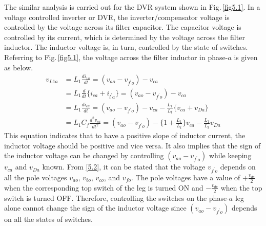 The similar analysis is carried out for the DVR system shown in Fig.\,\ref{fig5.1}. In a voltage controlled inverter or DVR, the inverter/compensator voltage is controlled by the voltage across its filter capacitor. The capacitor voltage is controlled by its current, which is determined by the voltage across the filter inductor. The inductor voltage is, in turn, controlled by the state of switches. Referring to Fig.\,\ref{fig5.1}, the voltage across the filter inductor in phase-$a$ is given as below.
\begin{equation}
\begin{aligned}
v_{L1a} &= L_{1}\frac{di_{1a}}{dt} = (v_{ao} - v_{f^\prime o}) - v_{ca} \\
        &= L_{1}\frac{d}{dt} \Big\{i_{ca} + i_{l^{\prime}a} \Big\} = (v_{ao} - v_{f^\prime o}) - v_{ca} \\
        &= L_{1}\frac{di_{ca}}{dt} = (v_{ao} - v_{f^\prime o}) - v_{ca} - \frac{L_1}{L_t} \Big\{ v_{ca} + v_{Da} \Big\} \\
        &= L_{1}C_f\frac{d^2v_{ca}}{dt^2} = (v_{ao} - v_{f^\prime o}) - \Big\{ 1 + \frac{L_1}{L_t} \Big\} v_{ca} -  \frac{L_1}{L_t} v_{Da}  
\end{aligned}
\end{equation}
This equation indicates that to have a positive slope of inductor current, the inductor voltage should be positive and vice versa.  It also implies that the sign of the inductor voltage can be changed by controlling $(v_{ao} - v_{f^\prime o})$ while keeping $v_{ca}$ and $v_{Da}$ known. From \eqref{5.2}, it can be stated that the voltage $v_{f^\prime o}$ depends on all the pole voltages $v_{ao}, \, v_{bo}, \, v_{co}$, and $v_{fo}$. The pole voltages have a value of $+\frac{v_{dc}}{2}$ when the corresponding top switch of the leg is turned ON and $-\frac{v_{dc}}{2}$ when the top switch is turned OFF. Therefore, controlling the switches on the phase-$a$ leg alone cannot change the sign of the inductor voltage since  $(v_{ao} - v_{f^\prime o})$ depends on all the states of switches. 

